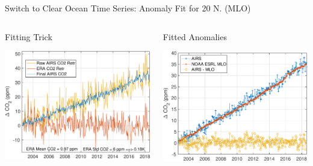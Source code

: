 \documentclass[10pt,t]{beamer}
\begin{document}
\begin{frame}[label={sec:orgc9dcc68}]{\small Switch to Clear Ocean Time Series: \cd Anomaly Fit for 20\textdegree{} N. (MLO)}
\vspace{-0.3in}
\begin{columns}
\begin{column}{0.55\columnwidth}
\begin{block}{\footnotesize Fitting Trick}
\begin{center}
\includegraphics[width=\linewidth]{./Figs/Pdf/raw_co2_vs_era_co2_example_lati28_mlo_lat.pdf}
\end{center}
\end{block}
\end{column}

\begin{column}{0.55\columnwidth}
\begin{block}{\footnotesize Fitted \cd Anomalies}
\begin{center}
\includegraphics[width=\linewidth]{./Figs/Pdf/co2_airs_vs_mlo.pdf}
\end{center}
\end{block}
\end{column}
\end{columns}


\end{frame}
\end{document}
